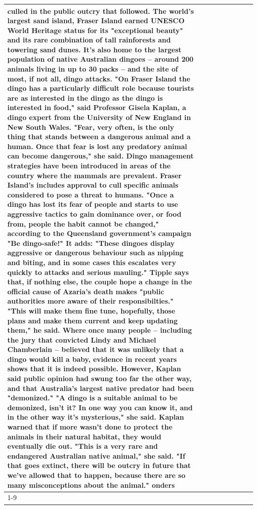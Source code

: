 \begin{table}[H]
\begin{tabular}{lllrlllll}
culled in the public outcry that followed. The world's largest sand island, Fraser Island earned UNESCO World Heritage status for its "exceptional beauty" and its rare combination of tall rainforests and towering sand dunes. It's also home to the largest population of native Australian dingoes -- around 200 animals living in up to 30 packs -- and the site of most, if not all, dingo attacks. "On Fraser Island the dingo has a particularly difficult role because tourists are as interested in the dingo as the dingo is interested in food," said Professor Gisela Kaplan, a dingo expert from the University of New England in New South Wales. "Fear, very often, is the only thing that stands between a dangerous animal and a human. Once that fear is lost any predatory animal can become dangerous," she said. Dingo management strategies have been introduced in areas of the country where the mammals are prevalent. Fraser Island's includes approval to cull specific animals considered to pose a threat to humans. "Once a dingo has lost its fear of people and starts to use aggressive tactics to gain dominance over, or food from, people the habit cannot be changed," according to the Queensland government's campaign "Be dingo-safe!" It adds: "These dingoes display aggressive or dangerous behaviour such as nipping and biting, and in some cases this escalates very quickly to attacks and serious mauling." Tipple says that, if nothing else, the couple hope a change in the official cause of Azaria's death makes "public authorities more aware of their responsibilties." "This will make them fine tune, hopefully, those plans and make them current and keep updating them," he said. Where once many people -- including the jury that convicted Lindy and Michael Chamberlain -- believed that it was unlikely that a dingo would kill a baby, evidence in recent years shows that it is indeed possible. However, Kaplan said public opinion had swung too far the other way, and that Australia's largest native predator had been "demonized." "A dingo is a suitable animal to be demonized, isn't it? In one way you can know it, and in the other way it's mysterious," she said. Kaplan warned that if more wasn't done to protect the animals in their natural habitat, they would eventually die out. "This is a very rare and endangered Australian native animal," she said. "If that goes extinct, there will be outcry in future that we've allowed that to happen, because there are so many misconceptions about the animal." onders \\
\cline{1-9}

\end{tabular}
\end{table}
